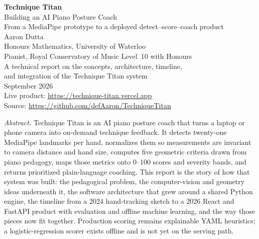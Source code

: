 \documentclass[11pt,a4paper]{article}
\newcommand{\tturl}[1]{\url{#1}}
\begin{document}
\begin{titlepage}
\centering
\vspace*{1.4cm}
{\Large\bfseries Technique Titan}\\[0.45cm]
{\LARGE Building an AI Piano Posture Coach}\\[0.7cm]
{\large From a MediaPipe prototype to a deployed detect--score--coach product}\\[1.4cm]
{\large Aaron Dutta}\\[0.35cm]
{\normalsize Honours Mathematics, University of Waterloo}\\[0.15cm]
{\normalsize Pianist, Royal Conservatory of Music Level~10 with Honours}\\[1.1cm]
{\normalsize A technical report on the concepts, architecture, timeline,}\\[0.1cm]
{\normalsize and integration of the Technique Titan system}\\[1.4cm]
{\normalsize September 2026}\\[0.3cm]
{\small Live product: \tturl{https://technique-titan.vercel.app}}\\[0.15cm]
{\small Source: \tturl{https://github.com/defAaron/TechniqueTitan}}\\[2.2cm]
\begin{minipage}{0.88\textwidth}
\small
\noindent\textit{Abstract.}
Technique Titan is an AI piano posture coach that turns a laptop or phone camera into on-demand technique feedback.
It detects twenty-one MediaPipe landmarks per hand, normalizes them so measurements are invariant to camera distance and hand size, computes five geometric criteria drawn from piano pedagogy, maps those metrics onto 0--100 scores and severity bands, and returns prioritized plain-language coaching.
This report is the story of how that system was built: the pedagogical problem, the computer-vision and geometry ideas underneath it, the software architecture that grew around a shared Python engine, the timeline from a 2024 hand-tracking sketch to a 2026 React and FastAPI product with evaluation and offline machine learning, and the way those pieces now fit together.
Production scoring remains explainable YAML heuristics; a logistic-regression scorer exists offline and is not yet on the serving path.
\end{minipage}
\vfill
\end{titlepage}

\tableofcontents
\newpage

\end{document}
